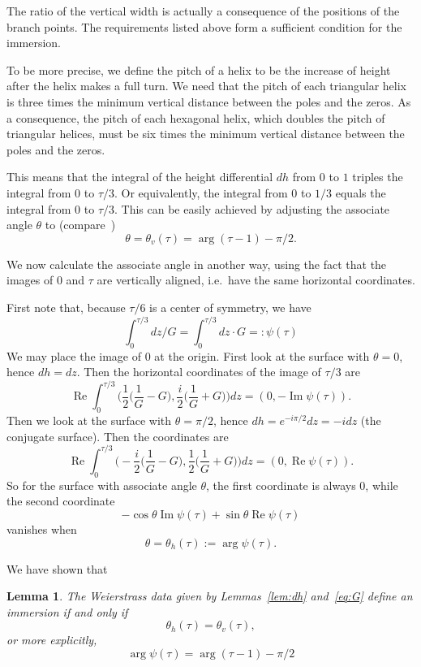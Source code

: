 \documentclass[a4paper]{amsart}
\newcommand{\re}{\operatorname{Re}}
\newcommand{\im}{\operatorname{Im}}
\theoremstyle{plain}
\newtheorem{lemma}[theorem]{Lemma}
\theoremstyle{definition}
\begin{document}
The ratio of the vertical width is actually a consequence of the positions of
the branch points.  The requirements listed above form a sufficient condition
for the immersion.

To be more precise, we define the pitch of a helix to be the increase of height
after the helix makes a full turn.  We need that the pitch of each triangular
helix is three times the minimum vertical distance between the poles and the
zeros.  As a consequence, the pitch of each hexagonal helix, which doubles the
pitch of triangular helices, must be six times the minimum vertical distance
between the poles and the zeros.

This means that the integral of the height differential $dh$
from $0$ to $1$ triples the integral from $0$ to $\tau/3$.  Or
equivalently, the integral from $0$ to $1/3$ equals the integral from $0$ to
$\tau/3$.  This can be easily achieved by adjusting the associate angle
$\theta$ to (compare~\cite[Definition~4.2]{weyhaupt2008})
\[
	\theta = \theta_v(\tau) = \arg(\tau-1) - \pi/2.
\]

\medskip

We now calculate the associate angle in another way, using the fact that the
images of $0$ and $\tau$ are vertically aligned, i.e.\ have the same
horizontal coordinates.

First note that, because $\tau/6$ is a center of symmetry, we have
\[
	\int_0^{\tau/3} dz/G = \int_0^{\tau/3} dz \cdot G =: \psi(\tau)
\]
We may place the image of $0$ at the origin.  First look at the surface with
$\theta=0$, hence $dh = dz$.  Then the horizontal coordinates of the image of
$\tau/3$ are
\[
	\re \int_0^{\tau/3} \Big(\frac{1}{2}\big(\frac{1}{G}-G\big), \frac{i}{2}\big(\frac{1}{G}+G\big)\Big)dz = (0, -\im \psi(\tau)).
\]
Then we look at the surface with $\theta=\pi/2$, hence $dh = e^{-i\pi/2} dz =
-i dz$ (the conjugate surface).  Then the coordinates are
\[
	\re \int_0^{\tau/3} \Big(-\frac{i}{2}\big(\frac{1}{G}-G\big), \frac{1}{2}\big(\frac{1}{G}+G\big)\Big)dz = (0, \re \psi(\tau)).
\]
So for the surface with associate angle $\theta$, the first coordinate is
always $0$, while the second coordinate
\[
	- \cos\theta \im\psi(\tau) + \sin\theta \re\psi(\tau)
\]
vanishes when
\[
	\theta = \theta_h(\tau) := \arg\psi(\tau).
\]

\medskip

We have shown that

\begin{lemma}
	The Weierstrass data given by Lemmas~\ref{lem:dh} and~\eqref{eq:G} define an
	immersion if and only if
	\[
		\theta_h(\tau)=\theta_v(\tau),
	\]
	or more explicitly,
	\begin{equation}\label{eq:period}
		\arg\psi(\tau) = \arg(\tau-1)-\pi/2
	\end{equation}
\end{lemma}
\end{document}
